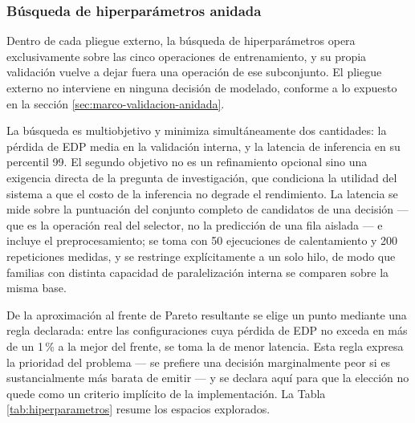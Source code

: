 \documentclass[12pt,oneside,spanish]{book}
\begin{document}
\subsubsection*{Búsqueda de hiperparámetros anidada}
\label{sec:fase2-optuna}

Dentro de cada pliegue externo, la búsqueda de hiperparámetros opera exclusivamente sobre las cinco operaciones de entrenamiento, y su propia validación vuelve a dejar fuera una operación de ese subconjunto. El pliegue externo no interviene en ninguna decisión de modelado, conforme a lo expuesto en la sección \ref{sec:marco-validacion-anidada}.

La búsqueda es multiobjetivo y minimiza simultáneamente dos cantidades: la pérdida de EDP media en la validación interna, y la latencia de inferencia en su percentil 99. El segundo objetivo no es un refinamiento opcional sino una exigencia directa de la pregunta de investigación, que condiciona la utilidad del sistema a que el costo de la inferencia no degrade el rendimiento. La latencia se mide sobre la puntuación del conjunto completo de candidatos de una decisión --- que es la operación real del selector, no la predicción de una fila aislada --- e incluye el preprocesamiento; se toma con 50 ejecuciones de calentamiento y 200 repeticiones medidas, y se restringe explícitamente a un solo hilo, de modo que familias con distinta capacidad de paralelización interna se comparen sobre la misma base.

De la aproximación al frente de Pareto resultante se elige un punto mediante una regla declarada: entre las configuraciones cuya pérdida de EDP no exceda en más de un 1\,\% a la mejor del frente, se toma la de menor latencia. Esta regla expresa la prioridad del problema --- se prefiere una decisión marginalmente peor si es sustancialmente más barata de emitir --- y se declara aquí para que la elección no quede como un criterio implícito de la implementación. La Tabla \ref{tab:hiperparametros} resume los espacios explorados.
\end{document}
